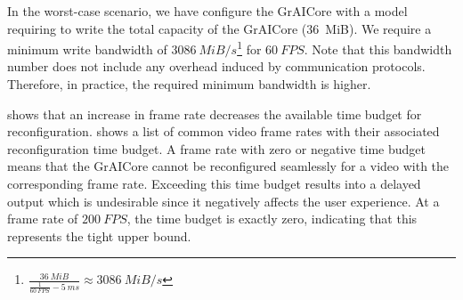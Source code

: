 In the worst-case scenario, we have configure the GrAICore with a model requiring to write the total capacity of the GrAICore (\SI{36}{MiB}).
We require a minimum write bandwidth of $\SI{3086}{MiB/s}$\footnote{$\frac{\SI{36}{MiB}}{\frac{1}{\SI{60}{FPS}} - \SI{5}{ms}} \approx \SI{3086}{MiB/s}$} for $\SI{60}{FPS}$.
Note that this bandwidth number does not include any overhead induced by communication protocols. Therefore, in practice, the required minimum bandwidth is higher. 

 shows that an increase in frame rate decreases the available time budget for reconfiguration.
 shows a list of common video frame rates with their associated reconfiguration time budget.
A frame rate with zero or negative time budget means that the GrAICore cannot be reconfigured seamlessly for a video with the corresponding frame rate.
Exceeding this time budget results into a delayed output which is undesirable since it negatively affects the user experience.
At a frame rate of $\SI{200}{FPS}$, the time budget is exactly zero, indicating that this represents the tight upper bound.

%     


